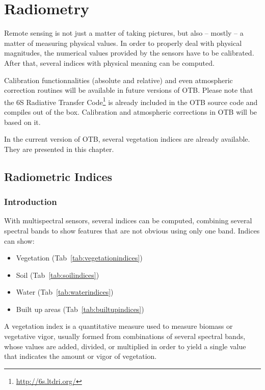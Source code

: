 \chapter{Radiometry}

Remote sensing is not just a matter of taking pictures, but also --
mostly -- a matter of measuring physical values. In order to properly
deal with physical magnitudes, the numerical values provided by the
sensors have to be calibrated. After that, several indices with
physical meaning can be computed.

Calibration functionnalities (absolute and relative) and even
atmospheric correction routines will be available in future versions
of OTB. Please note that the 6S Radiative Transfer Code\footnote{\url{http://6s.ltdri.org/}} is already included in the OTB source code and
compiles out of the box. Calibration and atmospheric corrections in
OTB will be based on it.

In the current version of OTB, several vegetation indices are already
available. They are presented in this chapter.


\section{Radiometric Indices}
\label{sec:VegetationIndex}
\label{sec:RadiometricIndex}

\subsection{Introduction}

With multispectral sensors, several indices can be computed, combining several
spectral bands to show features that are not obvious using only one band.
Indices can show:
\begin{itemize}
  \item Vegetation (Tab~\ref{tab:vegetationindices})
  \item Soil (Tab~\ref{tab:soilindices})
  \item Water (Tab~\ref{tab:waterindices})
  \item Built up areas (Tab~\ref{tab:builtupindices})
\end{itemize}

A vegetation index is a quantitative measure used to measure biomass
or vegetative vigor, usually formed from combinations of several
spectral bands, whose values are added, divided, or multiplied in
order to yield a single value that indicates the amount or vigor of
vegetation.

